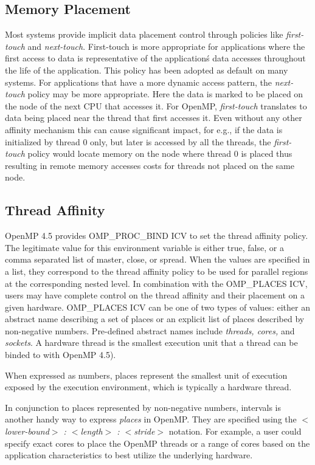 \subsection{Memory Placement}
Most systems provide implicit data placement control through policies like \textit{first-touch} 
and \textit{next-touch}. First-touch is more appropriate for applications where the 
first access to data is representative of the application\'s data accesses throughout 
the life of the application. This policy has been adopted as default on many systems. 
For applications that have a more dynamic access pattern, the \textit{next-touch} 
policy may be more appropriate. Here the data is marked to be placed on the node of the 
next CPU that accesses it. For OpenMP, \textit{first-touch} translates to data being 
placed near the thread that first accesses it. Even without any other affinity mechanism this 
can cause significant impact, for e.g., if the data is initialized by thread 0 only, but later is accessed 
by all the threads, the \textit{first-touch} policy would locate memory on the node where 
thread 0 is placed thus resulting in remote memory accesses costs for threads not placed on the same node. 

\subsection{Thread Affinity}
OpenMP 4.5 provides OMP\_PROC\_BIND ICV to set the thread affinity policy. The legitimate value for 
this environment variable is either true, false, or a comma separated list of master, close, or spread. 
When the values are specified in a list, they correspond to the thread affinity policy to be used for 
parallel regions at the corresponding nested level. In combination with the OMP\_PLACES ICV, 
users may have complete control on the thread affinity and their placement on a given hardware. 
OMP\_PLACES ICV can be one of two types of values: either an abstract name describing a set 
of places or an explicit list of places described by non-negative numbers. Pre-defined abstract 
names include \textit{threads, cores,} and \textit{sockets}. A hardware thread is the smallest execution 
unit that a thread can be binded to with OpenMP 4.5). 


When expressed as numbers, places 
represent the smallest unit of execution exposed by the execution environment, which is typically 
a hardware thread.

In conjunction to places represented by non-negative numbers, intervals is another handy way to 
express \textit{places} in OpenMP. They are specified using the \textit{$<$lower-bound$>$ : $<$length$>$ : $<$stride$>$} notation. For example, a user could specify exact cores to place the OpenMP threads or a range of cores based on the application characteristics to best utilize the underlying hardware.

